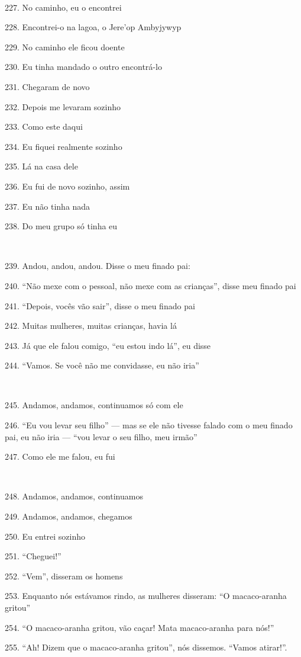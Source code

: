 ~

227. No caminho, eu o encontrei

228. Encontrei-o na lagoa, o Jere'op Ambyjywyp

229. No caminho ele ficou doente

230. Eu tinha mandado o outro encontrá-lo

231. Chegaram de novo

232. Depois me levaram sozinho

233. Como este daqui

234. Eu fiquei realmente sozinho

235. Lá na casa dele

236. Eu fui de novo sozinho, assim

237. Eu não tinha nada

238. Do meu grupo só tinha eu

~

239. Andou, andou, andou. Disse o meu finado pai:

240. ``Não mexe com o pessoal, não mexe com as crianças'', disse meu finado pai

241. ``Depois, vocês vão sair'', disse o meu finado pai

242. Muitas mulheres, muitas crianças, havia lá

243. Já que ele falou comigo, ``eu estou indo lá'', eu disse

244. ``Vamos. Se você não me convidasse, eu não iria''

~

245. Andamos, andamos, continuamos só com ele

246. ``Eu vou levar seu filho'' --- mas se ele não tivesse falado com o meu
finado pai, eu não iria --- ``vou levar o seu filho, meu irmão''

247. Como ele me falou, eu fui

~

248. Andamos, andamos, continuamos

249. Andamos, andamos, chegamos

250. Eu entrei sozinho

251. ``Cheguei!''

252. ``Vem'', disseram os homens

253. Enquanto nós estávamos rindo, as mulheres disseram: ``O macaco-aranha gritou''

254. ``O macaco-aranha gritou, vão caçar! Mata macaco-aranha para nós!''

255. ``Ah! Dizem que o macaco-aranha gritou'', nós dissemos. ``Vamos atirar!''.

